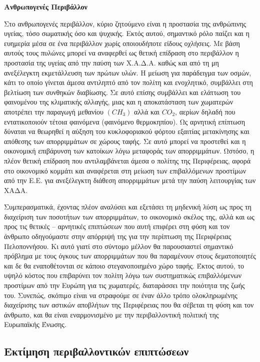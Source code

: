 \documentclass[12pt]{article}
\begin{document}
	\textbf{Ανθρωπογενές Περιβάλλον}
	
	Στο ανθρωπογενές περιβάλλον, κύριο ζητούμενο είναι η προστασία της ανθρώπινης υγείας, τόσο σωματικής όσο και ψυχικής. Εκτός αυτού, σημαντικό ρόλο παίζει και η ευημερία μέσα σε ένα περιβάλλον χωρίς οποιουδήποτε είδους οχλήσεις. Με βάση αυτούς τους πυλώνες μπορεί να αναφερθεί ως θετική επίδραση στο περιβάλλον η προστασία της υγείας από την παύση των Χ.Α.Δ.Α. καθώς και από τη μη ανεξέλεγκτη εκμετάλλευση των πρώτων υλών. Η μείωση για παράδειγμα των οσμών, κάτι το οποίο γίνεται άμεσα αντιληπτό από τον πολίτη και ενοχλητικό, συμβάλλει στη βελτίωση των συνθηκών διαβίωσης. Σε αυτό επίσης συμβάλλει και ελάττωση του φαινομένου της κλιματικής αλλαγής, μιας και η αποκατάσταση των χωματερών αποτρέπει την παραγωγή μεθανίου $(CH_3)$ αλλά και $CO_2$, αερίων δηλαδή που εντατικοποιούν τέτοια φαινόμενα (φαινόμενο θερμοκηπίου). Ως αρνητική επίπτωση δύναται να θεωρηθεί η αύξηση του κυκλοφοριακού φόρτου εξαιτίας μετακίνησης και απόθεσης των απορριμμάτων σε χώρους ταφής. Σε αυτό μπορεί να προστεθεί και η οικονομική επιβάρυνση των κατοίκων λόγω μεταφοράς των απορριμμάτων. Ωστόσο, η πλέον θετική επίδραση που αντιλαμβάνεται άμεσα ο πολίτης της Περιφέρειας, αφορά στο οικονομικό κομμάτι και αναφέρεται στη μείωση των επιβαλλόμενων προστίμων από την Ε.Ε. για ανεξέλεγκτη διάθεση απορριμμάτων μετά την παύση λειτουργίας των ΧΑΔΑ.
	
	Συμπερασματικά, έχοντας πλέον αναλύσει και εξετάσει τη μηδενική λύση ως προς τη διαχείριση των ποσοτήτων των απορριμμάτων, το οικονομικό σκέλος της, αλλά και ως προς τις θετικές – αρνητικές επιπτώσεων που αυτή επιφέρει στη φύση και τον άνθρωπο οδηγούμαστε στην απόρριψή της για την περίπτωση της Περιφέρειας Πελοποννήσου. Κι αυτό γιατί στο σύντομο μέλλον θα παρουσιαστεί σημαντικό πρόβλημα με τους όγκους των απορριμμάτων που θα παραμένουν στους δεματοποιητές και δε θα εναποθέτονται σε κάποιο στεγανοποιημένο χώρο ταφής. Έκτος αυτού, το υψηλό κόστος που επιβαρύνει τον πολίτη λόγω των συστηματικώς επιβαλλόμενων προστίμων από την Ευρώπη για τις χωματερές, διαταράσσει την ποιότητα της ζωής του. Συνεπώς, σκόπιμο είναι να στραφούμε σε έναν άλλο τρόπο ολοκληρωμένης διαχείρισης των αστικών αποβλήτων της Περιφέρειας που θα σέβεται τη φύση και τον άνθρωπο, και θα είναι εναρμονισμένο με την περιβαλλοντική πολιτική της Ευρωπαϊκής Ένωσης.
	
	\subsection{Εκτίμηση περιβαλλοντικών επιπτώσεων}
	
\end{document}
